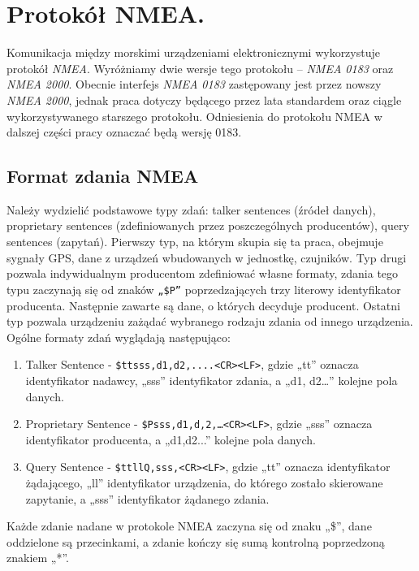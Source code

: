 \documentclass[skorowidz,skroty]{dyplomWEZUT}
\begin{document}


\chapter{Protokół NMEA.}\label{chap:NMEA protocol}

Komunikacja między morskimi urządzeniami elektronicznymi wykorzystuje protokół \textit{NMEA}. Wyróżniamy dwie wersje tego protokołu – \textit{NMEA 0183} oraz \textit{NMEA 2000}. Obecnie interfejs \textit{NMEA 0183} zastępowany jest przez nowszy \textit{NMEA 2000}, jednak praca dotyczy będącego przez lata standardem oraz ciągle wykorzystywanego starszego protokołu. Odniesienia do protokołu NMEA w dalszej części pracy oznaczać będą wersję 0183. 

\section{Format zdania NMEA}\label{sec:format nmea}

Należy wydzielić podstawowe typy zdań: talker sentences (źródeł danych), proprietary sentences (zdefiniowanych przez poszczególnych producentów), query sentences (zapytań). Pierwszy typ, na którym skupia się ta praca, obejmuje sygnały GPS,  dane z urządzeń wbudowanych w jednostkę, czujników. Typ drugi pozwala indywidualnym producentom zdefiniować własne formaty, zdania tego typu zaczynają się od znaków \texttt{„\$P”} poprzedzających trzy literowy identyfikator producenta. Następnie zawarte są dane, o których decyduje producent. Ostatni typ pozwala urządzeniu zażądać wybranego rodzaju zdania od innego urządzenia. Ogólne formaty zdań wyglądają następująco:
\begin{enumerate}
\item Talker Sentence - \texttt{\$ttsss,d1,d2,....<CR><LF>}, gdzie „tt” oznacza identyfikator nadawcy, „sss” identyfikator zdania, a „d1, d2…” kolejne pola danych. 
\item Proprietary Sentence - \texttt{\$Psss,d1,d,2,…<CR><LF>}, gdzie „sss” oznacza identyfikator producenta, a „d1,d2...” kolejne pola danych.
\item Query Sentence - \texttt{\$ttllQ,sss,<CR><LF>}, gdzie „tt” oznacza identyfikator żądającego, „ll” identyfikator urządzenia, do którego zostało skierowane zapytanie, a „sss” identyfikator żądanego zdania.
\end{enumerate}
Każde zdanie nadane w protokole NMEA zaczyna się od znaku „\$”, dane oddzielone są przecinkami, a zdanie kończy się sumą kontrolną poprzedzoną znakiem „*”.
\end{document}
